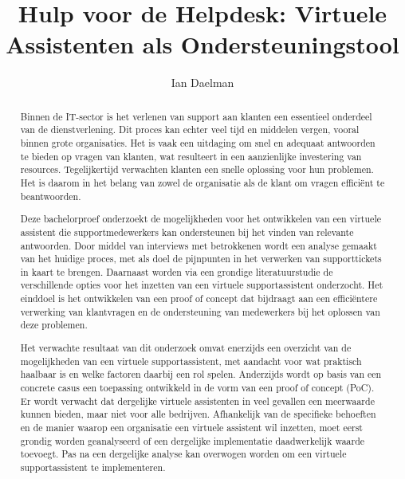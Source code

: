\documentclass{hogent-article}
\title{Hulp voor de Helpdesk: Virtuele Assistenten als Ondersteuningstool}
\author{Ian Daelman}
\begin{document}
\begin{abstract}
  
  Binnen de IT-sector is het verlenen van support aan klanten een essentieel onderdeel van de dienstverlening. Dit proces kan echter veel tijd en middelen vergen, vooral binnen grote organisaties. Het is vaak een uitdaging om snel en adequaat antwoorden te bieden op vragen van klanten, wat resulteert in een aanzienlijke investering van resources. Tegelijkertijd verwachten klanten een snelle oplossing voor hun problemen. Het is daarom in het belang van zowel de organisatie als de klant om vragen efficiënt te beantwoorden.
  
  Deze bachelorproef onderzoekt de mogelijkheden voor het ontwikkelen van een virtuele assistent die supportmedewerkers kan ondersteunen bij het vinden van relevante antwoorden. Door middel van interviews met betrokkenen wordt een analyse gemaakt van het huidige proces, met als doel de pijnpunten in het verwerken van supporttickets in kaart te brengen. Daarnaast worden via een grondige literatuurstudie de verschillende opties voor het inzetten van een virtuele supportassistent onderzocht. Het einddoel is het ontwikkelen van een proof of concept dat bijdraagt aan een efficiëntere verwerking van klantvragen en de ondersteuning van medewerkers bij het oplossen van deze problemen.
  
  Het verwachte resultaat van dit onderzoek omvat enerzijds een overzicht van de mogelijkheden van een virtuele supportassistent, met aandacht voor wat praktisch haalbaar is en welke factoren daarbij een rol spelen. Anderzijds wordt op basis van een concrete casus een toepassing ontwikkeld in de vorm van een proof of concept (PoC). Er wordt verwacht dat dergelijke virtuele assistenten in veel gevallen een meerwaarde kunnen bieden, maar niet voor alle bedrijven. Afhankelijk van de specifieke behoeften en de manier waarop een organisatie een virtuele assistent wil inzetten, moet eerst grondig worden geanalyseerd of een dergelijke implementatie daadwerkelijk waarde toevoegt. Pas na een dergelijke analyse kan overwogen worden om een virtuele supportassistent te implementeren.
  
 
\end{abstract}

\tableofcontents



\printbibliography[heading=bibintoc]
\end{document}
